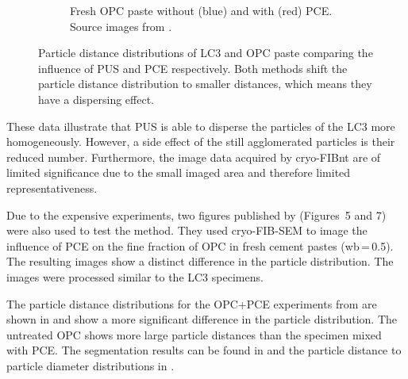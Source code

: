 \begin{figure}[H]
\begin{subfigure}[t]{0.495\textwidth}
		\caption{
            Fresh \ac{OPC} paste without ({\color{blue}blue}) and with ({\color{red}red}) \acs*{PCE}.
		    Source images from \cite{zingg.2008a}.
        }
		\label{fig:cryo-fib-results_2b}
	\end{subfigure}

    \caption{
		Particle distance distributions of \acs*{LC3} and \acs*{OPC} paste comparing the influence of \acs*{PUS} and \acs*{PCE} respectively.
		Both methods shift the particle distance distribution to smaller distances, which means they have a dispersing effect.
    }
    \label{fig:cryo-fib-results_2}
\end{figure}

These data illustrate that \ac{PUS} is able to disperse the particles of the \ac{LC3} more homogeneously.
However, a side effect of the still agglomerated particles is their reduced number.
Furthermore, the image data acquired by cryo-\ac{FIBnt} are of limited significance due to the small imaged area and therefore limited representativeness.

Due to the expensive experiments, two figures published by \textcite{zingg.2008a} (Figures~\num{5} and \num{7}) were also used to test the method.
They used cryo-\ac{FIB}-\ac{SEM} to image the influence of \ac{PCE} on the fine fraction of \ac{OPC} in fresh cement pastes (\ac{wb}\,=\,\num{0.5}).
The resulting images show a distinct difference in the particle distribution.
The images were processed similar to the \ac{LC3} specimens.

The particle distance distributions for the \ac{OPC}+\ac{PCE} experiments from \textcite{zingg.2008a} are shown in  and show a more significant difference in the particle distribution.
The untreated \ac{OPC} shows more large particle distances than the specimen mixed with \ac{PCE}.
The segmentation results can be found in  and the particle distance to particle diameter distributions in .

